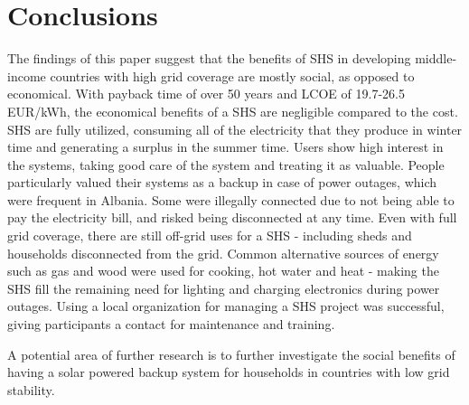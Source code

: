 
\chapter{Conclusions}
\label{ch:conclusion}

The findings of this paper suggest that the benefits of SHS in developing middle-income countries with high grid coverage are mostly social, as opposed to economical. With payback time of over 50 years and LCOE of 19.7-26.5 EUR/kWh, the economical benefits of a SHS are negligible compared to the cost. SHS are fully utilized, consuming all of the electricity that they produce in winter time and generating a surplus in the summer time. Users show high interest in the systems, taking good care of the system and treating it as valuable. People particularly valued their systems as a backup in case of power outages, which were frequent in Albania. Some were illegally connected due to not being able to pay the electricity bill, and risked being disconnected at any time. Even with full grid coverage, there are still off-grid uses for a SHS - including sheds and households disconnected from the grid. Common alternative sources of energy such as gas and wood were used for cooking, hot water and heat - making the SHS fill the remaining need for lighting and charging electronics during power outages. Using a local organization for managing a SHS project was successful, giving participants a contact for maintenance and training. 

A potential area of further research is to further investigate the social benefits of having a solar powered backup system for households in countries with low grid stability. 